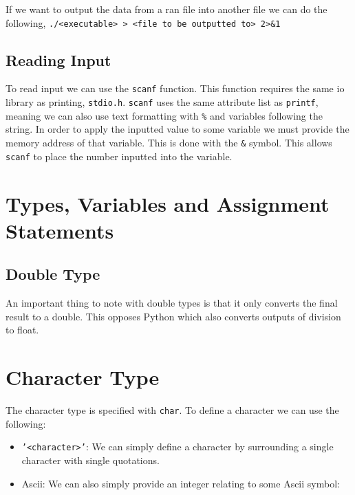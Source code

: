 \documentclass{report}
\begin{document}
   If we want to output the data from a ran file into another file we can do the following, \texttt{./<executable> > <file to be outputted to> 2>\&1}

   \subsection{Reading Input}
   To read input we can use the \texttt{scanf} function. This function requires the same io library as printing, \texttt{stdio.h}. \texttt{scanf} uses the same attribute list as \texttt{printf}, meaning we can also use text formatting with \texttt{\%} and variables following the string.
   In order to apply the inputted value to some variable we must provide the memory address of that variable. This is done with the \texttt{\&} symbol. This allows \texttt{scanf} to place the number inputted into the variable.


   \section{Types, Variables and Assignment Statements}

   \subsection{Double Type}
   An important thing to note with double types is that it only converts the final result to a double. This opposes Python which also converts outputs of division to float.

   \section{Character Type}
   The character type is specified with \texttt{char}. To define a character we can use the following:
   \begin{itemize}
      \item \texttt{'<character>'}: We can simply define a character by surrounding a single character with single quotations. 
      \item Ascii: We can also simply provide an integer relating to some Ascii symbol:
   \end{itemize}


    
\end{document}
